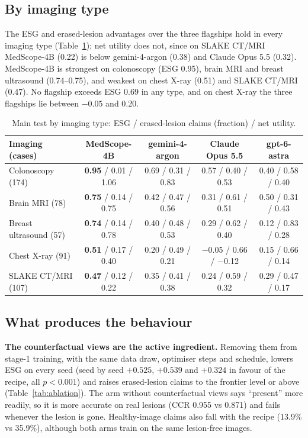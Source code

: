 \documentclass[11pt]{article}
\newcommand{\best}[1]{\textbf{#1}}
\begin{document}
\subsection{By imaging type}
The ESG and erased-lesion advantages over the three flagships hold in every imaging type (Table~\ref{tab:types}); net utility does not, since on SLAKE CT/MRI MedScope-4B (0.22) is below gemini-4-argon (0.38) and Claude Opus 5.5 (0.32). MedScope-4B is strongest on colonoscopy (ESG 0.95), brain MRI and breast ultrasound (0.74--0.75), and weakest on chest X-ray (0.51) and SLAKE CT/MRI (0.47). No flagship exceeds ESG 0.69 in any type, and on chest X-ray the three flagships lie between $-0.05$ and 0.20.

\begin{table}[t]
\centering\footnotesize\setlength{\tabcolsep}{4pt}
\caption{Main test by imaging type: ESG / erased-lesion claims (fraction) / net utility.}
\label{tab:types}
\begin{tabular}{lcccc}
\toprule
Imaging (cases) & MedScope-4B & gemini-4-argon & Claude Opus 5.5 & gpt-6-astra \\
\midrule
Colonoscopy (174) & \best{0.95} / 0.01 / 1.06 & 0.69 / 0.31 / 0.83 & 0.57 / 0.40 / 0.53 & 0.40 / 0.58 / 0.40 \\
Brain MRI (78) & \best{0.75} / 0.14 / 0.75 & 0.42 / 0.47 / 0.56 & 0.31 / 0.61 / 0.51 & 0.50 / 0.31 / 0.43 \\
Breast ultrasound (57) & \best{0.74} / 0.14 / 0.78 & 0.40 / 0.48 / 0.53 & 0.29 / 0.62 / 0.40 & 0.12 / 0.83 / 0.28 \\
Chest X-ray (91) & \best{0.51} / 0.17 / 0.40 & 0.20 / 0.49 / 0.21 & $-$0.05 / 0.66 / $-$0.12 & 0.15 / 0.66 / 0.14 \\
SLAKE CT/MRI (107) & \best{0.47} / 0.12 / 0.22 & 0.35 / 0.41 / 0.38 & 0.24 / 0.59 / 0.32 & 0.29 / 0.47 / 0.17 \\
\bottomrule
\end{tabular}
\end{table}

\subsection{What produces the behaviour}\label{sec:ablation}
\textbf{The counterfactual views are the active ingredient.} Removing them from stage-1 training, with the same data draw, optimiser steps and schedule, lowers ESG on every seed (seed by seed $+0.525$, $+0.539$ and $+0.324$ in favour of the recipe, all $p<0.001$) and raises erased-lesion claims to the frontier level or above (Table~\ref{tab:ablation}). The arm without counterfactual views says ``present'' more readily, so it is more accurate on real lesions (CCR 0.955 vs 0.871) and fails whenever the lesion is gone. Healthy-image claims also fall with the recipe (13.9\% vs 35.9\%), although both arms train on the same lesion-free images.
\end{document}
